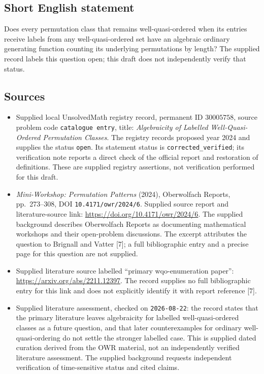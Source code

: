 \documentclass[11pt]{article}
\begin{document}
\subsection{Short English statement}
Does every permutation class that remains well-quasi-ordered when its entries receive labels from any well-quasi-ordered set have an algebraic ordinary generating function counting its underlying permutations by length? The supplied record labels this question open; this draft does not independently verify that status.
\subsection{Sources}
\begin{itemize}
\item Supplied local UnsolvedMath registry record, permanent ID \(30005758\), source problem code \texttt{catalogue entry}, title: \emph{Algebraicity of Labelled Well-Quasi-Ordered Permutation Classes}. The registry records proposed year 2024 and supplies the status \texttt{open}. Its statement status is \texttt{corrected\_verified}; its verification note reports a direct check of the official report and restoration of definitions. These are supplied registry assertions, not verification performed for this draft.
\item \emph{Mini-Workshop: Permutation Patterns} (2024), Oberwolfach Reports, pp.~273--308, DOI \texttt{10.4171/owr/2024/6}. Supplied source report and literature-source link: \url{https://doi.org/10.4171/owr/2024/6}. The supplied background describes Oberwolfach Reports as documenting mathematical workshops and their open-problem discussions. The excerpt attributes the question to Brignall and Vatter [7]; a full bibliographic entry and a precise page for this question are not supplied.
\item Supplied literature source labelled ``primary wqo-enumeration paper'': \url{https://arxiv.org/abs/2211.12397}. The record supplies no full bibliographic entry for this link and does not explicitly identify it with report reference [7].
\item Supplied literature assessment, checked on \texttt{2026-08-22}: the record states that the primary literature leaves algebraicity for labelled well-quasi-ordered classes as a future question, and that later counterexamples for ordinary well-quasi-ordering do not settle the stronger labelled case. This is supplied dated curation derived from the OWR material, not an independently verified literature assessment. The supplied background requests independent verification of time-sensitive status and cited claims.
\end{itemize}
\end{document}
